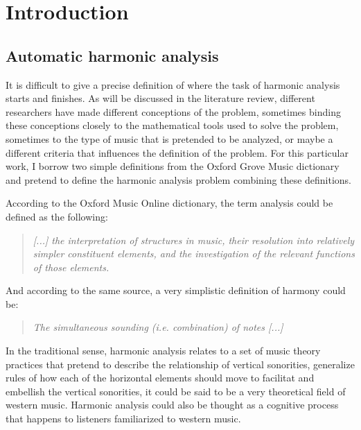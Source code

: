 \chapter{Introduction}

\section{Automatic harmonic analysis}
It is difficult to give a precise definition of where the task of harmonic analysis starts and finishes. As will be discussed in the literature review, different researchers have made different conceptions of the problem, sometimes binding these conceptions closely to the mathematical tools used to solve the problem, sometimes to the type of music that is pretended to be analyzed, or maybe a different criteria that influences the definition of the problem. For this particular work, I borrow two simple definitions from the Oxford Grove Music dictionary and pretend to define the harmonic analysis problem combining these definitions.

According to the Oxford Music Online dictionary, the term analysis could be defined as the following: \cite{oxfordanalysis}

\begin{quote}
\centering
\emph{[...] the interpretation of structures in music, \linebreak
their resolution into relatively simpler constituent elements, \linebreak and the investigation of the relevant functions of those elements.}
\end{quote}

And according to the same source, a very simplistic definition of harmony could be: \cite{oxfordharmony}

\begin{quote}
\centering
\emph{The simultaneous sounding (i.e. combination) of notes [...]}
\end{quote}

In the traditional sense, harmonic analysis relates to a set of music theory practices that pretend to describe the relationship of vertical sonorities, generalize rules of how each of the horizontal elements should move to facilitat and embellish the vertical sonorities, it could be said to be a very theoretical field of western music. Harmonic analysis could also be thought as a cognitive process that happens to listeners familiarized to western music.

